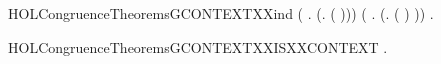 \begin{SaveVerbatim}{HOLCongruenceTheoremsGCONTEXTXXind}
       (\HOLSymConst{\HOLTokenForall{}} .   \HOLSymConst{\HOLTokenImp{}}  (\HOLTokenLambda{}. \HOLConst{\ensuremath{\nu}}  ( ))) \HOLSymConst{\HOLTokenConj{}}
       (\HOLSymConst{\HOLTokenForall{}} .   \HOLSymConst{\HOLTokenImp{}}  (\HOLTokenLambda{}.  ( ) )) \HOLSymConst{\HOLTokenImp{}}
       \HOLSymConst{\HOLTokenForall{}}.   \HOLSymConst{\HOLTokenImp{}}  
\end{SaveVerbatim}
\newcommand{\HOLCongruenceTheoremsGCONTEXTXXind}{\UseVerbatim{HOLCongruenceTheoremsGCONTEXTXXind}}
\begin{SaveVerbatim}{HOLCongruenceTheoremsGCONTEXTXXISXXCONTEXT}
\HOLTokenTurnstile{} \HOLSymConst{\HOLTokenForall{}}.   \HOLSymConst{\HOLTokenImp{}}  
\end{SaveVerbatim}
\newcommand{\HOLCongruenceTheoremsGCONTEXTXXISXXCONTEXT}{\UseVerbatim{HOLCongruenceTheoremsGCONTEXTXXISXXCONTEXT}}
